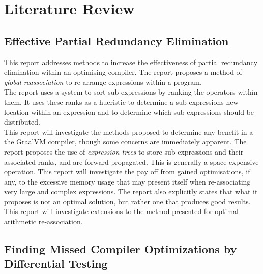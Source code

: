 \documentclass[12pt,openany,a4paper]{book}
\begin{document}
\chapter{Literature Review}
\label{litrev}

\section{Effective Partial Redundancy Elimination}
\label{litrev1}

This report addresses methods to increase the effectiveness of partial redundancy
elimination within an optimising compiler. The report proposes a method of
\emph{global reassociation} to re-arrange expressions within a program.\\
The report uses a system to sort sub-expressions by ranking the operators within
them. It uses these ranks as a hueristic to determine a sub-expressions new
location within an expression and to determine which sub-expressions should be
distributed.\\
This report will investigate the methods proposed to determine any benefit in
a the GraalVM compiler, though some concerns are immediately apparent. The report
proposes the use of \emph{expression trees} to store sub-expressions and their
associated ranks, and are forward-propagated. This is generally a space-expensive
operation. This report will investigate the pay off from gained optimisations, if any, to 
the excessive memory usage that may present itself when re-associating very large 
and complex expressions. The report also explicitly states that what it proposes 
is not an optimal solution, but rather one that produces good results. 
This report will investigate extensions to the method presented for optimal 
arithmetic re-association.~\cite{effective-pre}

\section{Finding Missed Compiler Optimizations by Differential Testing}
\label{litrev2}
\end{document}
